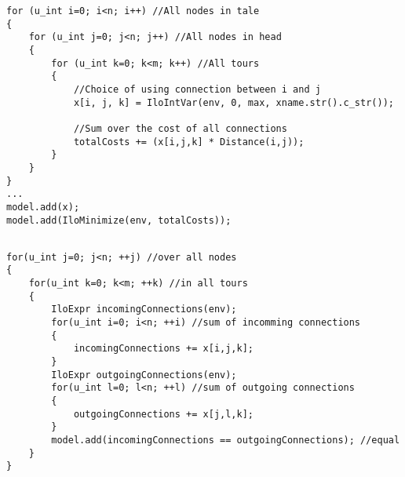 \begin{appendices}


\begin{lstlisting}[caption=Objective function, label={app:app01}]
for (u_int i=0; i<n; i++) //All nodes in tale
{
    for (u_int j=0; j<n; j++) //All nodes in head
    {
    	for (u_int k=0; k<m; k++) //All tours
        {
            //Choice of using connection between i and j
            x[i, j, k] = IloIntVar(env, 0, max, xname.str().c_str());
            
            //Sum over the cost of all connections
            totalCosts += (x[i,j,k] * Distance(i,j));
        }
    }
}
...
model.add(x);
model.add(IloMinimize(env, totalCosts));
     
\end{lstlisting}





\begin{lstlisting}[caption=Sample of an implemented constraint,
label={app:app02}] for(u_int j=0; j<n; ++j) //over all nodes
{
    for(u_int k=0; k<m; ++k) //in all tours 
    {
        IloExpr incomingConnections(env);
        for(u_int i=0; i<n; ++i) //sum of incomming connections
        {
            incomingConnections += x[i,j,k];
        }
        IloExpr outgoingConnections(env);
        for(u_int l=0; l<n; ++l) //sum of outgoing connections
        {
            outgoingConnections += x[j,l,k];
        }
        model.add(incomingConnections == outgoingConnections); //equal
    }
}
\end{lstlisting}

\end{appendices}